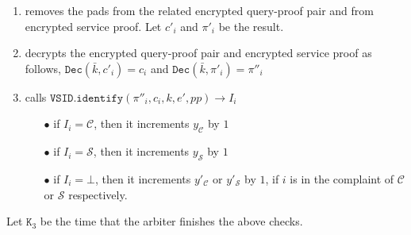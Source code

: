 \begin{enumerate}
\begin{enumerate}
\begin{enumerate}
\item removes the pads from the related encrypted    query-proof pair  and from encrypted service proof. Let $c'_{\scriptscriptstyle i}$ and $\pi'_{\scriptscriptstyle i}$ be the result. %
\item decrypts the encrypted query-proof pair and encrypted service proof as follows, $ \mathtt{Dec}(\bar{k},c'_{\scriptscriptstyle i})=c_{\scriptscriptstyle i}$ and 
$ \mathtt{Dec}(\bar{k},\pi'_{\scriptscriptstyle i})=\pi''_{\scriptscriptstyle i}$ 
\item\label{arbiter-identify} calls   $\mathtt{VSID.identify}(\pi''_{\scriptscriptstyle i},c_{\scriptscriptstyle i}, k, e', {pp})\rightarrow I_{\scriptscriptstyle i}$
\begin{enumerate}
\item[$\bullet$] if $I_{\scriptscriptstyle i}=\mathcal C$, then it increments $y_{\scriptscriptstyle\mathcal C}$ by $1$ 
\item[$\bullet$]  if $I_{\scriptscriptstyle i}=\mathcal S$, then it increments $y_{\scriptscriptstyle\mathcal S}$ by $1$ 
\item[$\bullet$]  if $I_{\scriptscriptstyle i}=\bot$, then it increments  $y'_{\scriptscriptstyle\mathcal C}$ or $y'_{\scriptscriptstyle\mathcal S}$ by $1$, if $i$ is in  the complaint of $\mathcal {C}$ or $\mathcal {S}$ respectively. 
\end{enumerate}
\end{enumerate}

%
%
%
%
Let $\texttt{K}_{\scriptscriptstyle 3}$ be the time that the arbiter finishes the above checks.


\end{enumerate}
\end{enumerate}
